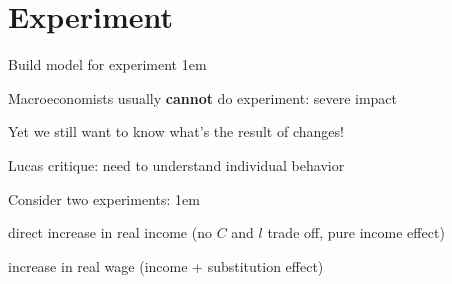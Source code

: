 \documentclass[11pt,aspectratio=43]{beamer}
\let\olditemize=\itemize
\let\endolditemize=\enditemize
\renewenvironment{itemize}{\olditemize \itemsep1em}{\endolditemize}
\let\oldenumerate=\enumerate
\let\endoldenumerate=\endenumerate
\renewenvironment{enumerate}{\oldenumerate \itemsep1em}{ \endoldenumerate}
\theoremstyle{definition}
\begin{document}
\section{Experiment}
\label{sec:Experiment}

\begin{frame}{Build model for experiment}
\label{slide:Build_model_for_experiment}
    \begin{itemize}
        \item Macroeconomists usually \textbf{cannot} do experiment: severe impact
        \item Yet we still want to know \alert{what's the result of changes}!
        \item \alert{Lucas critique}: need to understand individual behavior
        \item Consider two experiments:
        \begin{enumerate}
            \item direct increase in \alert{real income} (no $ C $ and $ l $ trade off, pure \alert{income effect})
            \item increase in \alert{real wage} (\alert{income + substitution effect})
        \end{enumerate}
    \end{itemize}
\end{frame}
\end{document}
